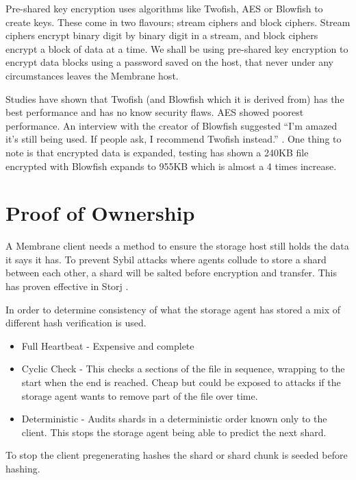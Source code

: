 \documentclass[a4paper, 11pt, twocolumn, twoside]{report}
\begin{document}
Pre-shared key encryption uses algorithms like Twofish, AES or Blowfish to create keys. These come in two flavours; stream ciphers and block ciphers. Stream ciphers encrypt binary digit by binary digit in a stream, and block ciphers encrypt a block of data at a time. We shall be using pre-shared key encryption to encrypt data blocks using a password saved on the host, that never under any circumstances leaves the Membrane host.

Studies have shown that Twofish (and Blowfish which it is derived from) has the best performance and has no know security flaws. AES showed poorest performance. \citep*{thakur2011aes, rizvi2011performance, mushtaque2014evaluation} An interview with the creator of Blowfish suggested ``I'm amazed it's still being used. If people ask, I recommend Twofish instead.'' \cite{fish2007bruce}.   One thing to note is that encrypted data is expanded, testing has shown a 240KB file encrypted with Blowfish expands to 955KB which is almost a 4 times increase. \citep{mushtaque2014evaluation}

\section{Proof of Ownership}

A Membrane client needs a method to ensure the storage host still holds the data it says it has. To prevent Sybil attacks where agents collude to store a shard between each other, a shard will be salted before encryption and transfer. This has proven effective in Storj \citep{Wilkinson14storja}.

In order to determine consistency of what the storage agent has stored a mix of different hash verification is used.
\begin{itemize}
 \item Full Heartbeat - Expensive and complete
 \item Cyclic Check - This checks a sections of the file in sequence, wrapping to the start when the end is reached. Cheap but could be exposed to attacks if the storage agent wants to remove part of the file over time.
 \item Deterministic - Audits shards in a deterministic order known only to the client. This stops the storage agent being able to predict the next shard.
\end{itemize}

To stop the client pregenerating hashes the shard or shard chunk is seeded before hashing.
\end{document}
